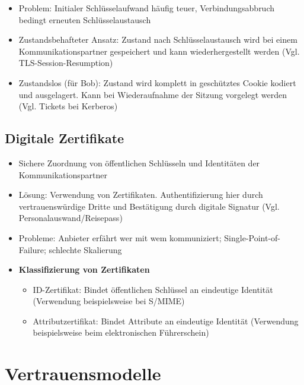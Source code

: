 \begin{itemize}
\begin{itemize}
		\begin{itemize}
			\item Problem: Initialer Schlüsselaufwand häufig teuer, Verbindungsabbruch bedingt erneuten Schlüsselaustausch
			\item Zustandsbehafteter Ansatz: Zustand nach Schlüsselaustausch wird bei einem Kommunikationspartner gespeichert und kann wiederhergestellt werden (Vgl. TLS-Session-Resumption)
			\item Zustandslos (für Bob): Zustand wird komplett in geschütztes Cookie kodiert und ausgelagert. Kann bei Wiederaufnahme der Sitzung vorgelegt werden (Vgl. Tickets bei Kerberos)
		\end{itemize}
	\end{itemize}
\end{itemize}


\subsection{Digitale Zertifikate}
\begin{itemize}
	\item Sichere Zuordnung von öffentlichen Schlüsseln und Identitäten der Kommunikationspartner
	\item Lösung: Verwendung von Zertifikaten. Authentifizierung hier durch vertrauenswürdige Dritte und Bestätigung durch digitale Signatur (Vgl. Personalauswand/Reisepass)
	\item Probleme: Anbieter erfährt wer mit wem kommuniziert; Single-Point-of-Failure; schlechte Skalierung
	\item \textbf{Klassifizierung von Zertifikaten}
	\begin{itemize}
		\item ID-Zertifikat: Bindet öffentlichen Schlüssel an eindeutige Identität (Verwendung beispielsweise bei S/MIME)
		\item Attributzertifikat: Bindet Attribute an eindeutige Identität (Verwendung beispielsweise beim elektronischen Führerschein)
	\end{itemize}
\end{itemize}



\section{Vertrauensmodelle}

